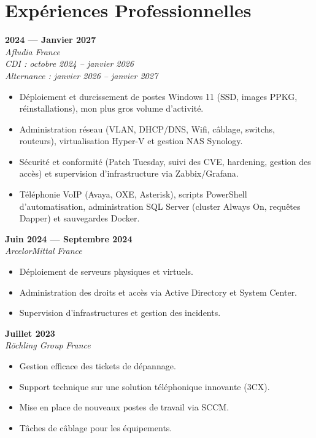 \documentclass[10pt,a4paper]{article}
\begin{document}
\section*{Expériences Professionnelles}

 \hfill \textbf{2024 — Janvier 2027} \\
\textit{Afludia} \hfill \textit{France} \\
\textit{CDI : octobre 2024 -- janvier 2026} \\
\textit{Alternance : janvier 2026 -- janvier 2027}
\begin{itemize}[leftmargin=0.5cm, noitemsep, topsep=0pt, partopsep=0pt]
    \item Déploiement et durcissement de postes Windows 11 (SSD, images PPKG, réinstallations), mon plus gros volume d'activité.
    \item Administration réseau (VLAN, DHCP/DNS, Wifi, câblage, switchs, routeurs), virtualisation Hyper-V et gestion NAS Synology.
    \item Sécurité et conformité (Patch Tuesday, suivi des CVE, hardening, gestion des accès) et supervision d'infrastructure via Zabbix/Grafana.
    \item Téléphonie VoIP (Avaya, OXE, Asterisk), scripts PowerShell d'automatisation, administration SQL Server (cluster Always On, requêtes Dapper) et sauvegardes Docker.
\end{itemize}

\vspace{0.1cm}

 \hfill \textbf{Juin 2024 — Septembre 2024} \\
\textit{ArcelorMittal} \hfill \textit{France}
\begin{itemize}[leftmargin=0.5cm, noitemsep, topsep=0pt, partopsep=0pt]
    \item Déploiement de serveurs physiques et virtuels.
    \item Administration des droits et accès via Active Directory et System Center.
    \item Supervision d'infrastructures et gestion des incidents.
\end{itemize}

\vspace{0.1cm}

 \hfill \textbf{Juillet 2023} \\
\textit{Röchling Group} \hfill \textit{France}
\begin{itemize}[leftmargin=0.5cm, noitemsep, topsep=0pt, partopsep=0pt]
    \item Gestion efficace des tickets de dépannage.
    \item Support technique sur une solution téléphonique innovante (3CX).
    \item Mise en place de nouveaux postes de travail via SCCM.
    \item Tâches de câblage pour les équipements.
\end{itemize}
\end{document}
